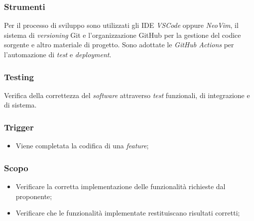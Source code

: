 \subsubsection*{Strumenti}
Per il processo di sviluppo sono utilizzati gli IDE \textit{VSCode} oppure \textit{NeoVim}, il sistema di \textit{versioning} Git e l'organizzazione {GitHub\g} per la gestione del codice sorgente e altro materiale di progetto. 
Sono adottate le \textit{GitHub Actions} per l'automazione di \textit{test} e \textit{deployment}.




\subsubsection{Testing} 
\label{testing}
Verifica della correttezza del \textit{software} attraverso \textit{test} funzionali, di integrazione e di sistema.

\subsubsection*{Trigger}
\begin{itemize}
	\item Viene completata la codifica di una \textit{feature};
\end{itemize}

\subsubsection*{Scopo}
\begin{itemize}
	\item Verificare la corretta implementazione delle funzionalità richieste dal proponente;
	\item Verificare che le funzionalità implementate restituiscano risultati corretti;
\end{itemize}

